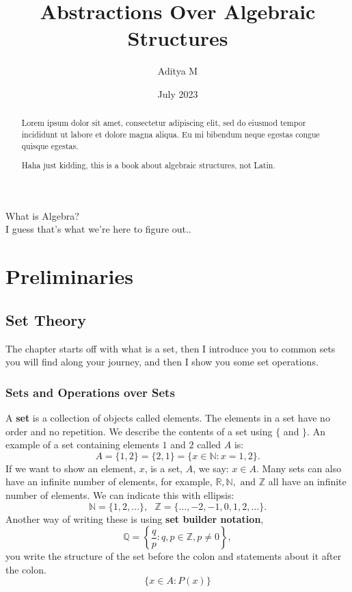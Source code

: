 \documentclass{report}
\title{Abstractions Over Algebraic Structures}
\author{Aditya M}
\date{July 2023}
\begin{document}
\maketitle

\begin{center}
    What is Algebra?\\
    \vspace*{2cm}
    I guess that's what we're here to figure out..
\end{center}

\tableofcontents

\begin{abstract}
    \begin{center}
        Lorem ipsum dolor sit amet, consectetur adipiscing elit, sed do eiusmod tempor incididunt ut labore et dolore magna aliqua. Eu mi bibendum neque egestas congue quisque egestas.
        \vspace*{2cm}
        
        Haha just kidding, this is a book about algebraic structures, not Latin.
    \end{center}
\end{abstract}
\part{Preliminaries}
\chapter{Set Theory}
The chapter starts off with what is a set, then I introduce you to common sets you will find along your journey, and then I show you some set operations.
\section{Sets and Operations over Sets}
A \textbf{set} is a collection of objects called elements. The elements in a set have no order and no repetition. We describe the contents of a set using $\{$ and $\}$.
An example of a set containing elements $1$ and $2$ called $A$ is: $$A = \{1, 2\} = \{2, 1\} = \{x \in \mathbb{N} : x = 1,2 \}.$$ If we want to show an element, $x$, is a set, $A$, we say: $x \in A$.
Many sets can also have an infinite number of elements, for example, $\mathbb{R}, \mathbb{N}, \text{ and } \mathbb{Z}$ all have an infinite number of elements.
We can indicate this with ellipsis: $$\mathbb{N} = \{1, 2, \dots \},\text{ } \mathbb{Z} = \{\dots, -2, -1, 0, 1, 2, \dots \}.$$
Another way of writing these is using \textbf{set builder notation},
$$\mathbb{Q} = \left\{\frac{q}{p} : q,p \in \mathbb{Z}, p \neq 0 \right\},$$
you write the structure of the set before the colon and statements about it after the colon.
$$\{x \in A : P(x)\}$$
\end{document}
